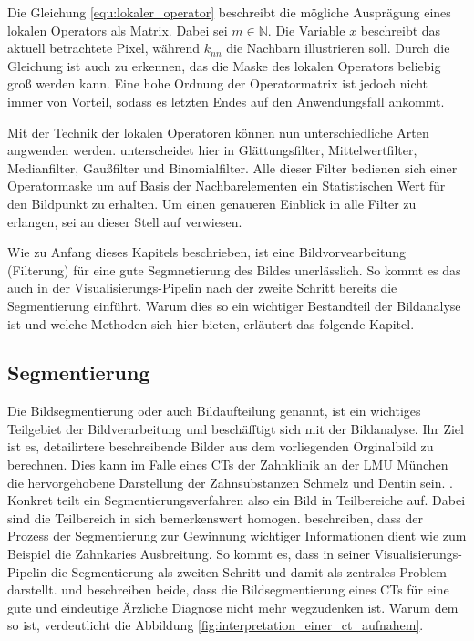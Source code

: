 Die Gleichung \ref{equ:lokaler_operator} beschreibt die mögliche Ausprägung eines
lokalen Operators als Matrix. Dabei sei $m \in \mathbb{N}$. Die Variable $x$ beschreibt
das aktuell betrachtete Pixel, während $k_{nn}$ die Nachbarn illustrieren soll. Durch
die Gleichung ist auch zu erkennen, das die Maske des lokalen Operators beliebig
groß werden kann. Eine hohe Ordnung der Operatormatrix ist jedoch nicht immer von
Vorteil, sodass es letzten Endes auf den Anwendungsfall ankommt.

Mit der Technik der lokalen Operatoren können nun unterschiedliche Arten
angwenden werden. \citet[Seite 54 - 55]{handels2000} unterscheidet hier in Glättungsfilter,
Mittelwertfilter, Medianfilter, Gaußfilter und Binomialfilter. Alle dieser Filter
bedienen sich einer Operatormaske um auf Basis der Nachbarelementen ein Statistischen
Wert für den Bildpunkt zu erhalten. Um einen genaueren Einblick in alle Filter
zu erlangen, sei an dieser Stell auf \citet[Seite 54 - 55]{handels2000} verwiesen.

Wie zu Anfang dieses Kapitels beschrieben, ist eine Bildvorvearbeitung (Filterung)
für eine gute Segmnetierung des Bildes unerlässlich. So kommt es das auch in der
Visualisierungs-Pipelin nach \citet[Seite 50]{handels2000} der zweite Schritt bereits
die Segmentierung einführt. Warum dies so ein wichtiger Bestandteil der
Bildanalyse ist und welche Methoden sich hier bieten, erläutert das folgende Kapitel.

\pagebreak

\subsection{Segmentierung}
\label{subsec:segmentierung} Die Bildsegmentierung oder auch Bildaufteilung
genannt, ist ein wichtiges Teilgebiet der Bildverarbeitung und beschäfftigt sich
mit der Bildanalyse. Ihr Ziel ist es, detailirtere beschreibende Bilder aus dem vorliegenden
Orginalbild zu berechnen. Dies kann im Falle eines CTs der Zahnklinik an der LMU
München die hervorgehobene Darstellung der Zahnsubstanzen Schmelz und Dentin
sein. \citep[vgl.][Seite 359]{lehmann2013bildverarbeitung}. Konkret teilt ein
Segmentierungsverfahren also ein Bild in Teilbereiche auf. Dabei sind die Teilbereich
in sich bemerkenswert homogen. \citet[Seite 1]{ramesh2021} beschreiben, dass der
Prozess der Segmentierung zur Gewinnung wichtiger Informationen dient wie zum Beispiel
die Zahnkaries Ausbreitung. So kommt es, dass \citet[Seite 50]{handels2000} in seiner
Visualisierungs-Pipelin die Segmentierung als zweiten Schritt und damit als zentrales
Problem darstellt. \citet[Seite 95]{handels2000} und \citet[Seite 360]{lehmann2013bildverarbeitung}
beschreiben beide, dass die Bildsegmentierung eines CTs für eine gute und eindeutige
Ärzliche Diagnose nicht mehr wegzudenken ist. Warum dem so ist, verdeutlicht die
Abbildung \ref{fig:interpretation_einer_ct_aufnahem}.

